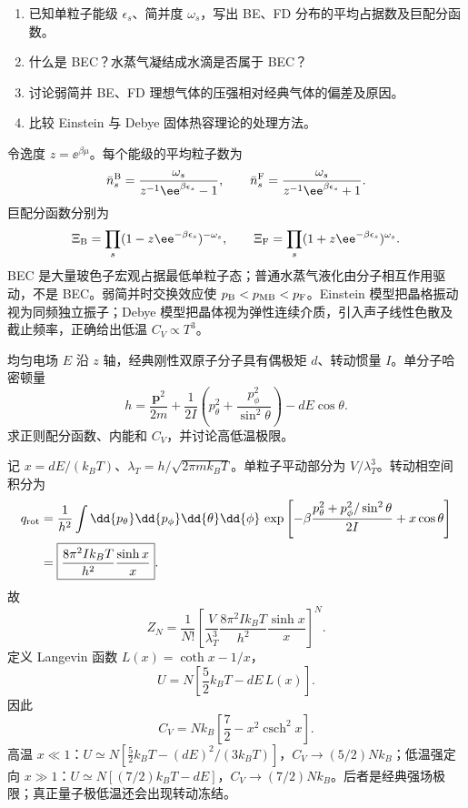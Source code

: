 
\begin{question}
\begin{enumerate}
\item 已知单粒子能级 $\epsilon_s$、简并度 $\omega_s$，写出 BE、FD 分布的平均占据数及巨配分函数。
\item 什么是 BEC？水蒸气凝结成水滴是否属于 BEC？
\item 讨论弱简并 BE、FD 理想气体的压强相对经典气体的偏差及原因。
\item 比较 Einstein 与 Debye 固体热容理论的处理方法。
\end{enumerate}
\begin{solution}
令逸度 $z=\ee^{\beta\mu}$。每个能级的平均粒子数为
\[\bar n_s^{\rm B}=\frac{\omega_s}{z^{-1}\ee^{\beta\epsilon_s}-1},\qquad \bar n_s^{\rm F}=\frac{\omega_s}{z^{-1}\ee^{\beta\epsilon_s}+1}.\]
巨配分函数分别为
\[\Xi_{\rm B}=\prod_s(1-z\ee^{-\beta\epsilon_s})^{-\omega_s},\qquad \Xi_{\rm F}=\prod_s(1+z\ee^{-\beta\epsilon_s})^{\omega_s}.\]
BEC 是大量玻色子宏观占据最低单粒子态；普通水蒸气液化由分子相互作用驱动，不是 BEC。弱简并时交换效应使 $p_{\rm B}<p_{\rm MB}<p_{\rm F}$。Einstein 模型把晶格振动视为同频独立振子；Debye 模型把晶体视为弹性连续介质，引入声子线性色散及截止频率，正确给出低温 $C_V\propto T^3$。
\end{solution}
\end{question}

\begin{question}
均匀电场 $E$ 沿 $z$ 轴，经典刚性双原子分子具有偶极矩 $d$、转动惯量 $I$。单分子哈密顿量
\[h=\frac{\bm p^2}{2m}+\frac{1}{2I}\left(p_\theta^2+\frac{p_\phi^2}{\sin^2\theta}\right)-dE\cos\theta.\]
求正则配分函数、内能和 $C_V$，并讨论高低温极限。
\begin{solution}
记 $x=dE/(k_BT)$、$\lambda_T=h/\sqrt{2\pi mk_BT}$。单粒子平动部分为 $V/\lambda_T^3$。转动相空间积分为
\begin{align*}
q_{\rm rot}&=\frac1{h^2}\int\dd{p_\theta}\dd{p_\phi}\dd{\theta}\dd{\phi}\,
\exp\left[-\beta\frac{p_\theta^2+p_\phi^2/\sin^2\theta}{2I}+x\cos\theta\right]\\
&=\boxed{\frac{8\pi^2Ik_BT}{h^2}\frac{\sinh x}{x}}.
\end{align*}
故
\[\boxed{Z_N=\frac1{N!}\left[\frac{V}{\lambda_T^3}\frac{8\pi^2Ik_BT}{h^2}\frac{\sinh x}{x}\right]^N}.\]
定义 Langevin 函数 $L(x)=\coth x-1/x$，
\[\boxed{U=N\left[\frac52k_BT-dE\,L(x)\right]}.\]
因此
\[\boxed{C_V=Nk_B\left[\frac72-x^2\operatorname{csch}^2x\right]}.\]
高温 $x\ll1$：$U\simeq N[\tfrac52k_BT-(dE)^2/(3k_BT)]$，$C_V\to(5/2)Nk_B$；低温强定向 $x\gg1$：$U\simeq N[(7/2)k_BT-dE]$，$C_V\to(7/2)Nk_B$。后者是经典强场极限；真正量子极低温还会出现转动冻结。
\end{solution}
\end{question}

